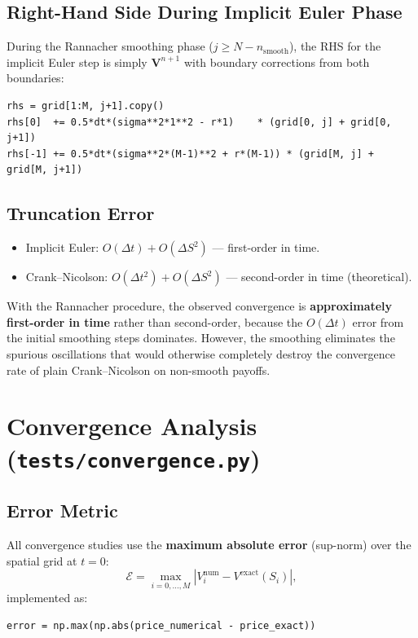 \documentclass[12pt, a4paper]{article}
\begin{document}
\subsection{Right-Hand Side During Implicit Euler Phase}

During the Rannacher smoothing phase ($j \geq N - n_{\text{smooth}}$), the
RHS for the implicit Euler step is simply $\bm{V}^{n+1}$ with boundary
corrections from both boundaries:
\begin{lstlisting}
rhs = grid[1:M, j+1].copy()
rhs[0]  += 0.5*dt*(sigma**2*1**2 - r*1)    * (grid[0, j] + grid[0, j+1])
rhs[-1] += 0.5*dt*(sigma**2*(M-1)**2 + r*(M-1)) * (grid[M, j] + grid[M, j+1])
\end{lstlisting}

\subsection{Truncation Error}

\begin{itemize}[noitemsep]
    \item Implicit Euler: $O(\Delta t) + O(\Delta S^2)$ — first-order in time.
    \item Crank--Nicolson: $O(\Delta t^2) + O(\Delta S^2)$ — second-order in time (theoretical).
\end{itemize}
With the Rannacher procedure, the observed convergence is
\textbf{approximately first-order in time} rather than second-order, because
the $O(\Delta t)$ error from the initial smoothing steps dominates. However,
the smoothing eliminates the spurious oscillations that would otherwise
completely destroy the convergence rate of plain Crank--Nicolson on
non-smooth payoffs.

\section{Convergence Analysis (\texttt{tests/convergence.py})}

\subsection{Error Metric}

All convergence studies use the \textbf{maximum absolute error} (sup-norm)
over the spatial grid at $t = 0$:
\begin{equation}
    \mathcal{E} = \max_{i=0,\ldots,M} \left|V_i^{\text{num}} - V^{\text{exact}}(S_i)\right|,
    \label{eq:error}
\end{equation}
implemented as:
\begin{lstlisting}
error = np.max(np.abs(price_numerical - price_exact))
\end{lstlisting}
\end{document}
